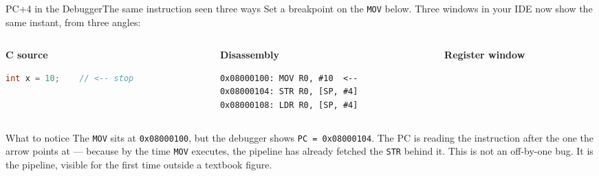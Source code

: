 \documentclass[9pt,aspectratio=169,xcolor=table]{beamer}
\begin{document}
\begin{frame}[fragile]{PC+4 in the Debugger}{The same instruction seen three ways}
    \leavevmode
    Set a breakpoint on the \texttt{MOV} below. Three windows in your IDE now show the same instant, from three angles:

    \vspace{2mm}
    \begin{columns}[T]
    \begin{column}{.30\textwidth}
        \textbf{C source}
\begin{lstlisting}[language=C, basicstyle=\ttfamily\scriptsize]
int x = 10;    // <-- stop
\end{lstlisting}
    \end{column}
    \begin{column}{.34\textwidth}
        \textbf{Disassembly}
\begin{lstlisting}[language=ARM, basicstyle=\ttfamily\scriptsize]
0x08000100: MOV R0, #10  <--
0x08000104: STR R0, [SP, #4]
0x08000108: LDR R0, [SP, #4]
\end{lstlisting}
    \end{column}
    \begin{column}{.30\textwidth}
        \textbf{Register window}
        \begin{center}
        \end{center}
    \end{column}
    \end{columns}

    \vspace{3mm}
    \begin{block}{What to notice}
        The \texttt{MOV} sits at \texttt{0x08000100}, but the debugger shows \texttt{PC = 0x08000104}. The PC is reading the instruction \alert{after} the one the arrow points at --- because by the time \texttt{MOV} executes, the pipeline has already \alert{fetched} the \texttt{STR} behind it. This is not an off-by-one bug. It is the pipeline, visible for the first time outside a textbook figure.
    \end{block}
\end{frame}
\end{document}
